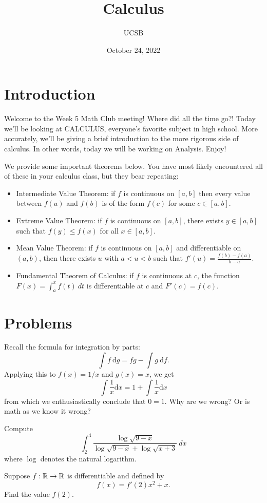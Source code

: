 \documentclass{article}
\title{Calculus}
\author{UCSB}
\date{October 24, 2022}
\begin{document}
\section{Introduction}
Welcome to the Week 5 Math Club meeting! Where did all the time go?! Today we'll be looking at CALCULUS, everyone's favorite subject
in high school. More accurately, we'll be giving a brief introduction to the more rigorous side of calculus. In other words, today 
we will be working on Analysis. Enjoy!

We provide some important theorems below.
You have most likely encountered all of these in your calculus class, but they bear repeating:
\begin{itemize}
    \item Intermediate Value Theorem: if $f$ is continuous on $[a,b]$ then every value between $f(a)$ and $f(b)$ is of the form $f(c) $ for some $c\in [a,b]$.
    \item Extreme Value Theorem: if $f$ is continuous on $[a,b]$, there exists $y\in [a,b]$ such that $f(y)\leq f(x)$ for all $x\in [a,b]$.
    \item Mean Value Theorem: if $f$ is continuous on $[a,b]$ and differentiable on $(a,b)$, then there exists $u$ with $a < u < b$ such that $f'(u)=\frac{f(b)-f(a)}{b-a}$.
    \item Fundamental Theorem of Calculus: if $f$ is continuous at $c$, the function $F(x) = \int_a^x f(t)\ dt$ is differentiable at $c$ and $F'(c)=f(c)$.
\end{itemize}
    
\section{Problems}
\begin{exercise}
Recall the formula for integration by parts:
\[\int f\ \mathrm{d}g = fg - \int g\ \mathrm{d}f.\]
Applying this to \(f(x)=1/x\) and \(g(x)=x\), we get
\[\int\frac{1}{x}\mathrm{d}x = 1 + \int\frac{1}{x}\mathrm{d}x\]
from which we enthusiastically conclude that \(0=1\).
Why are we wrong? Or is math as we know it wrong?
\end{exercise}

\begin{exercise}
        Compute
        \[\int_2^4 \frac{\log\sqrt{9-x}}{\log\sqrt{9-x}+\log\sqrt{x+3}}\ dx\] where $\log$ denotes the natural logarithm.
\end{exercise}
        
\begin{exercise}
Suppose \(f:\mathbb{R}\to\mathbb{R}\) is differentiable and defined by
\[f(x) = f'(2)x^2 + x.\]
Find the value \(f(2)\).
\end{exercise}
\end{document}
